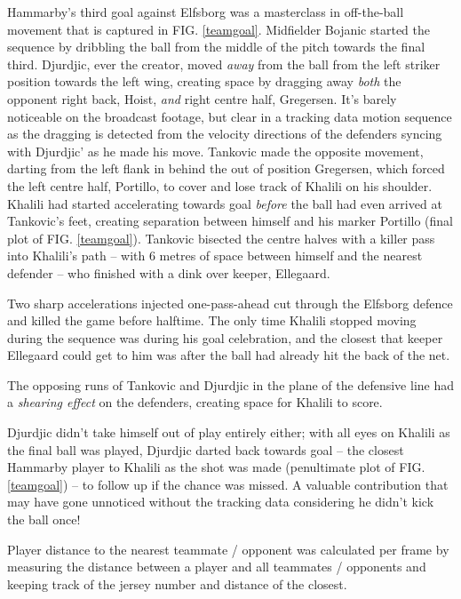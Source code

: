 \documentclass[twocolumn,prl,nobalancelastpage,aps,10pt]{revtex4-1}
\begin{document}
Hammarby's third goal against Elfsborg was a masterclass in off-the-ball movement that is captured in FIG. \ref{teamgoal}. Midfielder Bojanic started the sequence by dribbling the ball from the middle of the pitch towards the final third. Djurdjic, ever the creator, moved \textit{away} from the ball from the left striker position towards the left wing, creating space by dragging away \textit{both} the opponent right back, Hoist, \textit{and} right centre half, Gregersen. It's barely noticeable on the broadcast footage, but clear in a tracking data motion sequence as the dragging is detected from the velocity directions of the defenders syncing with Djurdjic' as he made his move. Tankovic made the opposite movement, darting from the left flank in behind the out of position Gregersen, which forced the left centre half, Portillo, to cover and lose track of Khalili on his shoulder. Khalili had started accelerating towards goal \textit{before} the ball had even arrived at Tankovic's feet, creating separation between himself and his marker Portillo (final plot of FIG. \ref{teamgoal}). Tankovic bisected the centre halves with a killer pass into Khalili's path -- with 6 metres of space between himself and the nearest defender -- who finished with a dink over keeper, Ellegaard.

Two sharp accelerations injected one-pass-ahead cut through the Elfsborg defence and killed the game before halftime. The only time Khalili stopped moving during the sequence was during his goal celebration, and the closest that keeper Ellegaard could get to him was after the ball had already hit the back of the net.

The opposing runs of Tankovic and Djurdjic in the plane of the defensive line had a \textit{shearing effect} on the defenders, creating space for Khalili to score.

Djurdjic didn't take himself out of play entirely either; with all eyes on Khalili as the final ball was played, Djurdjic darted back towards goal -- the closest Hammarby player to Khalili as the shot was made (penultimate plot of FIG. \ref{teamgoal}) -- to follow up if the chance was missed. A valuable contribution that may have gone unnoticed without the tracking data considering he didn't kick the ball once!

Player distance to the nearest teammate / opponent was calculated per frame by measuring the distance between a player and all teammates / opponents and keeping track of the jersey number and distance of the closest.
\end{document}
